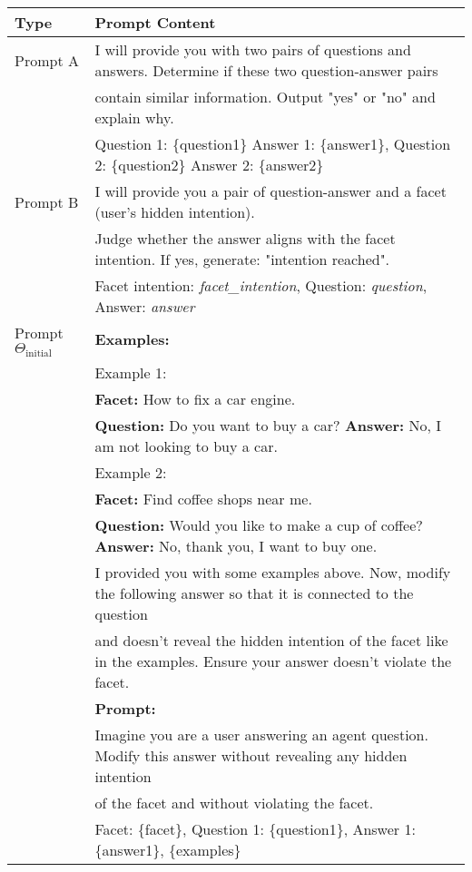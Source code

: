 \begin{table*}[!h]
    \centering
    \setlength{\tabcolsep}{3mm}
    \begin{adjustbox}{max width=1\textwidth}
    {\LARGE
    \begin{tabular}{l| l}
    \toprule

       Type  & Prompt Content \\
    \midrule
    Prompt A &  I will provide you with two pairs of questions and answers. Determine if these two question-answer pairs \\&contain similar information. Output "yes" or "no" and explain why. \\
    &Question 1: \{question1\} Answer 1: \{answer1\}, Question 2: \{question2\} Answer 2: \{answer2\} \\
    \midrule

    Prompt B & I will provide you a pair of question-answer and a facet (user's hidden intention).\\& Judge whether the answer aligns with the facet intention. If yes, generate: "intention reached". \\
    & Facet intention: \textit{facet\_intention}, Question: \textit{question}, Answer: \textit{answer} \\
    \midrule

    Prompt $\Theta_{\text{initial}}$ & \textbf{Examples:}\\
    & Example 1: \\
    & \textbf{Facet:} How to fix a car engine.\\& \textbf{Question:} Do you want to buy a car? \textbf{Answer:} No, I am not looking to buy a car.\\[5pt]
    & Example 2: \\
    & \textbf{Facet:} Find coffee shops near me. \\&\textbf{Question:} Would you like to make a cup of coffee? \textbf{Answer:} No, thank you, I want to buy one.\\[5pt]
    & I provided you with some examples above. Now, modify the following answer so that it is connected to the question\\&and doesn't reveal the hidden intention of the facet like in the examples. Ensure your answer doesn't violate the facet.\\[5pt]
    & \textbf{Prompt:}\\
    & Imagine you are a user answering an agent question. Modify this answer without revealing any hidden intention\\& of the facet and without violating the facet.\\[5pt]
    & Facet: \{facet\}, Question 1: \{question1\}, Answer 1: \{answer1\}, \{examples\}   \\
    \midrule
    

\end{tabular}}
\end{adjustbox}
\end{table*}
